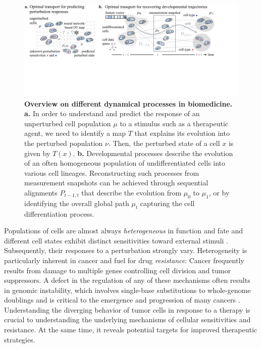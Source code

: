 \begin{figure}[t]
  \includegraphics[width=\textwidth]{figures/fig_bio_problems.pdf}
  \caption{\textbf{Overview on different dynamical processes in biomedicine.} \textbf{a.} In order to understand and predict the response of an unperturbed cell population $\mu$ to a stimulus such as a therapeutic agent, we need to identify a map $T$ that explains its evolution into the perturbed population $\nu$. Then, the perturbed state of a cell $x$ is given by $T(x)$.  \textbf{b.} Developmental processes describe the evolution of an often homogeneous population of undifferentiated cells into various cell lineages. Reconstructing such processes from measurement snapshots can be achieved through sequential alignments $P_{t-1,t}$ that describe the evolution from $\mu_0$ to $\mu_1$, or by identifying the overall global path $\mu_t$ capturing the cell differentiation process.}
  \label{fig:bio_problems}
\end{figure}

Populations of cells are almost always \emph{heterogeneous} in function and fate and different cell states exhibit distinct sensitivities toward external stimuli \citep{spiller2010measurement}.
Subsequently, their responses to a perturbation strongly vary.
Heterogeneity is particularly inherent in cancer and fuel for drug \emph{resistance}: 
Cancer frequently results from damage to multiple genes controlling cell division and tumor suppressors.
A defect in the regulation of any of these mechanisms often results in genomic instability, which involves single-base substitutions to whole-genome doublings and
is critical to the emergence and progression of many cancers \citep{dagogo2018tumour}. Understanding the diverging behavior of tumor cells in response to a therapy is crucial to understanding the underlying mechanisms of cellular sensitivities and resistance.
At the same time, it reveals potential targets for improved therapeutic strategies.

